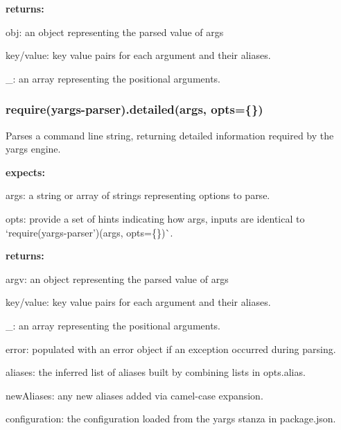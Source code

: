 {\bfseries returns\+:}


\begin{DoxyItemize}
\item {\ttfamily obj}\+: an object representing the parsed value of {\ttfamily args}
\begin{DoxyItemize}
\item {\ttfamily key/value}\+: key value pairs for each argument and their aliases.
\item {\ttfamily \+\_\+}\+: an array representing the positional arguments.
\end{DoxyItemize}
\end{DoxyItemize}

\subsubsection*{require(\textquotesingle{}yargs-\/parser\textquotesingle{}).detailed(args, opts=\{\})}

Parses a command line string, returning detailed information required by the yargs engine.

{\bfseries expects\+:}


\begin{DoxyItemize}
\item {\ttfamily args}\+: a string or array of strings representing options to parse.
\item {\ttfamily opts}\+: provide a set of hints indicating how {\ttfamily args}, inputs are identical to `require(\textquotesingle{}yargs-\/parser')(args, opts=\{\})\`{}.
\end{DoxyItemize}

{\bfseries returns\+:}


\begin{DoxyItemize}
\item {\ttfamily argv}\+: an object representing the parsed value of {\ttfamily args}
\begin{DoxyItemize}
\item {\ttfamily key/value}\+: key value pairs for each argument and their aliases.
\item {\ttfamily \+\_\+}\+: an array representing the positional arguments.
\end{DoxyItemize}
\item {\ttfamily error}\+: populated with an error object if an exception occurred during parsing.
\item {\ttfamily aliases}\+: the inferred list of aliases built by combining lists in {\ttfamily opts.\+alias}.
\item {\ttfamily new\+Aliases}\+: any new aliases added via camel-\/case expansion.
\item {\ttfamily configuration}\+: the configuration loaded from the {\ttfamily yargs} stanza in package.\+json.
\end{DoxyItemize}

